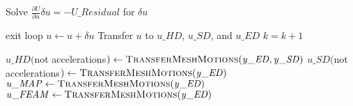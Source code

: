 \documentclass[10pt,letterpaper,oneside,notitlepage]{article}
\begin{document}
\begin{algorithmic}[1]
		\State Solve  $\frac{\partial U}{\partial u} \delta u = - \mathit{U\_Residual}$ for $\delta u$

		\State    
		 
			\State exit loop
		\EndIf
		\State
		\State $u \gets u + \delta u$
		\State Transfer $u$ to $\mathit{u\_HD}$, $\mathit{u\_SD}$, and $\mathit{u\_ED}$
		\State $k=k+1$
		
	\EndLoop	
	
	\State{}
	\State 
	
	\State$\mathit{u\_HD}($not accelerations$) \gets \Call{TransferMeshMotions}{\mathit{y\_ED},\mathit{y\_SD}}$
	\State$\mathit{u\_SD}($not accelerations$) \gets \Call{TransferMeshMotions}{\mathit{y\_ED}}$
  \State 
	\State $\mathit{u\_MAP}  \gets \Call{TransferMeshMotions}{\mathit{y\_ED}}$
	\State $\mathit{u\_FEAM} \gets \Call{TransferMeshMotions}{\mathit{y\_ED}}$
			
\EndProcedure

\end{algorithmic}
\end{document}
